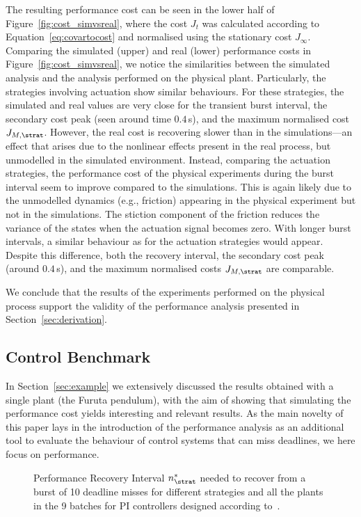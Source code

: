 The resulting performance cost can be seen in the lower half of Figure~\ref{fig:cost_simvsreal}, where the cost $J_t$ was calculated according to Equation~\eqref{eq:covartocost} and normalised using the stationary cost $J_\infty$. 
Comparing the simulated (upper) and real (lower) performance costs in Figure~\ref{fig:cost_simvsreal}, we notice the similarities between the simulated analysis and the analysis performed on the physical plant. 
%
Particularly, the strategies involving \tH{} actuation show similar behaviours. 
For these strategies, the simulated and real values are very close for the transient burst interval, the secondary cost peak (seen around time $0.4\,$s), and the maximum normalised cost $J_{M, \strat}$.
However, the real cost is recovering slower than in the simulations---an effect that arises due to the nonlinear effects present in the real process, but unmodelled in the simulated environment.
%
Instead, comparing the \tZ{} actuation strategies, the performance cost of the physical experiments during the burst interval seem to improve compared to the simulations.
This is again likely due to the unmodelled dynamics (e.g., friction) appearing in the physical experiment but not in the simulations.
The stiction component of the friction reduces the variance of the states when the actuation signal becomes zero.
With longer burst intervals, a similar behaviour as for the \tH{} actuation strategies would appear.
Despite this difference, both the recovery interval, the secondary cost peak (around $0.4\,$s), and the maximum normalised costs $J_{M,\strat}$ are comparable.

We conclude that the results of the experiments performed on the physical process support the validity of the performance analysis presented in Section~\ref{sec:derivation}.

\subsection{Control Benchmark}
\label{sec:aggregateresults}

In Section~\ref{sec:example} we extensively discussed the results obtained with a single plant (the Furuta pendulum), with the aim of showing that simulating the performance cost yields interesting and relevant results.
As the main novelty of this paper lays in the introduction of the performance analysis as an additional tool to evaluate the behaviour of control systems that can miss deadlines, we here focus on performance.

\begin{figure}[t]
    \centering
    \resizebox{0.95\textwidth}{!}{}
    \caption{Performance Recovery Interval $\recoverylengthinterval_{\strat}$ needed to recover from a burst of 10 deadline misses for different strategies and all the plants in the 9 batches for PI controllers designed according to~\cite{Garpinger:2015}.}
    \label{fig:overview10}
\end{figure}
\afterpage{\clearpage}

